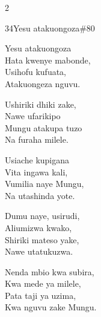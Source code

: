 \begin{multicols}{2}
\begin{hymn}{34}{Yesu atakuongoza}{\#80}
\begin{stanza}
Yesu atakuongoza\\
Hata kwenye mabonde,\\
Usihofu kufuata,\\
Atakuongeza nguvu.
\end{stanza}
\begin{chorus}
Ushiriki dhiki zake,\\
Nawe ufarikipo\\
Mungu atakupa tuzo\\
Na furaha milele.
\end{chorus}
\begin{stanza}
Usiache kupigana\\
Vita ingawa kali,\\
Vumilia naye Mungu,\\
Na utashinda yote.
\end{stanza}
\begin{stanza}
Dumu naye, usirudi,\\
Aliumizwa kwako,\\
Shiriki mateso yake,\\
Nawe utatukuzwa.
\end{stanza}
\begin{stanza}
Nenda mbio kwa subira,\\
Kwa mede ya milele,\\
Pata taji ya uzima,\\
Kwa nguvu zake Mungu.
\end{stanza}
\end{hymn}


\end{multicols}
